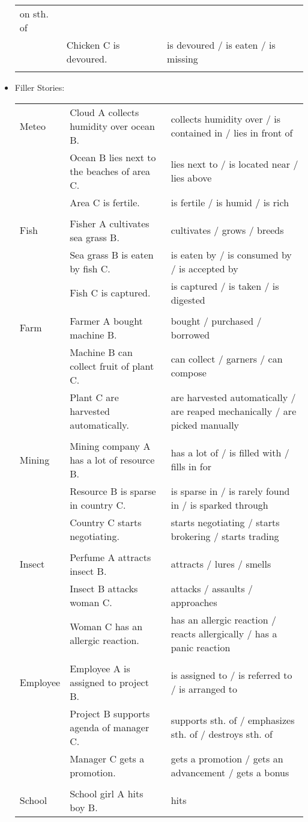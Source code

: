 \begin{itemize}
\begin{longtable}{p{}p{}p{}}
on sth. of \\   & Chicken C is devoured. & is devoured / is eaten / is missing \\  & & \\
\end{longtable}
\item \normalsize Filler Stories:
\scriptsize
\begin{longtable}{p{}p{}p{}}
Meteo & Cloud A collects humidity over ocean B. & collects humidity over / is contained in / lies in front of \\   & Ocean B lies next to the beaches of area C. & lies next to / is located near / lies above \\   & Area C is fertile. & is fertile / is humid / is rich \\  & & \\ Fish & Fisher A cultivates sea grass B. & cultivates / grows / breeds \\   & Sea grass B is eaten by fish C. & is eaten by / is consumed by / is accepted by \\   & Fish C is captured. & is captured / is taken / is digested \\  & & \\ Farm & Farmer A bought machine B. & bought / purchased / borrowed \\   & Machine B can collect fruit of plant C. & can collect / garners / can compose \\   & Plant C are harvested automatically. & are harvested automatically / are reaped mechanically / are picked manually \\  & & \\ Mining & Mining company A has a lot of resource B. & has a lot of / is filled with / fills in for \\   & Resource B is sparse in country C. & is sparse in / is rarely found in / is sparked through \\   & Country C starts negotiating. & starts negotiating / starts brokering / starts trading \\  & & \\ Insect & Perfume A attracts insect B. & attracts / lures / smells \\   & Insect B attacks woman C. & attacks / assaults / approaches \\   & Woman C has an allergic reaction. & has an allergic reaction / reacts allergically / has a panic reaction \\  & & \\ Employee & Employee A is assigned to project B. & is assigned to / is referred to / is arranged to \\   & Project B supports agenda of manager C. & supports sth. of / emphasizes sth. of / destroys sth. of \\   & Manager C gets a promotion. & gets a promotion / gets an advancement / gets a bonus \\  & & \\ School & School girl A hits boy B. & hits 
\end{longtable}
\end{itemize}
